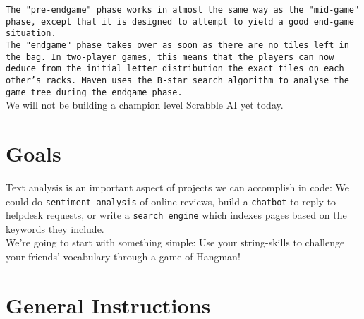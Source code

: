 \documentclass{42-en}
\begin{document}
\texttt{The "pre-endgame" phase works in almost the same way as the "mid-game" phase, except that it is designed to attempt to yield a good end-game situation.}\\

\texttt{The "endgame" phase takes over as soon as there are no tiles left in the bag. In two-player games, this means that the players can now deduce from the initial letter distribution the exact tiles on each other's racks. Maven uses the B-star search algorithm to analyse the game tree during the endgame phase.}\\

We will not be building a champion level Scrabble AI yet today.

\startexercices



\chapter{Goals}

Text analysis is an important aspect of projects we can accomplish in code: We could do \texttt{sentiment analysis} of online reviews, build a \texttt{chatbot} to reply to helpdesk requests, or write a \texttt{search engine} which indexes pages based on the keywords they include.\\

We're going to start with something simple: Use your string-skills to challenge your friends' vocabulary through a game of Hangman!


\chapter{General Instructions}
\end{document}
